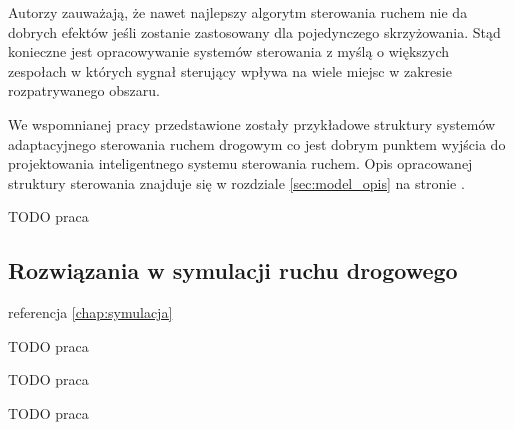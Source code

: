 Autorzy zauważają, że nawet najlepszy algorytm sterowania ruchem nie da dobrych efektów jeśli zostanie zastosowany dla pojedynczego skrzyżowania. Stąd konieczne jest opracowywanie systemów sterowania z myślą o większych zespołach w których sygnał sterujący wpływa na wiele miejsc w zakresie rozpatrywanego obszaru.

We wspomnianej pracy przedstawione zostały przykładowe struktury systemów adaptacyjnego sterowania ruchem drogowym co jest dobrym punktem wyjścia do projektowania inteligentnego systemu sterowania ruchem. Opis opracowanej struktury sterowania znajduje się w rozdziale \ref{sec:model_opis} na stronie \pageref{sec:model_opis}.

TODO praca \cite{ruchaj}

\subsection{Rozwiązania w symulacji ruchu drogowego}

referencja \ref{chap:symulacja}

TODO praca \cite{nasch}

TODO praca \cite{bernas+placzek}

TODO praca \cite{bartodziej}